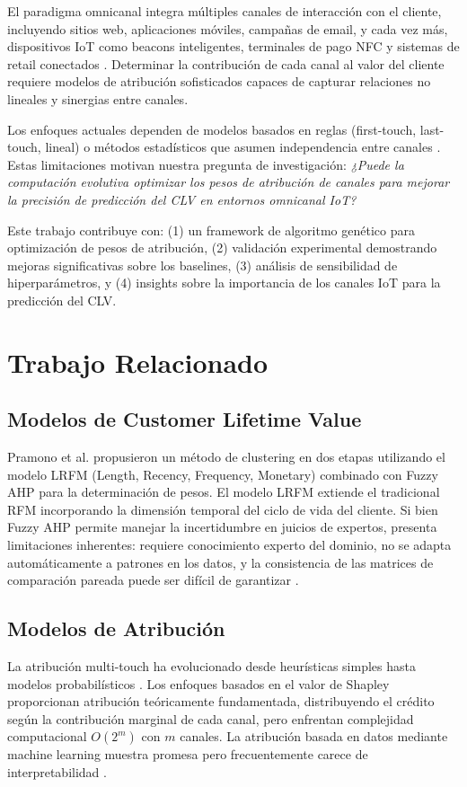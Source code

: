 \documentclass[conference]{IEEEtran}
\begin{document}
El paradigma omnicanal integra múltiples canales de interacción con el cliente, incluyendo sitios web, aplicaciones móviles, campañas de email, y cada vez más, dispositivos IoT como beacons inteligentes, terminales de pago NFC y sistemas de retail conectados \cite{verhoef2015}. Determinar la contribución de cada canal al valor del cliente requiere modelos de atribución sofisticados capaces de capturar relaciones no lineales y sinergias entre canales.

Los enfoques actuales dependen de modelos basados en reglas (first-touch, last-touch, lineal) o métodos estadísticos que asumen independencia entre canales \cite{anderl2016}. Estas limitaciones motivan nuestra pregunta de investigación: \textit{¿Puede la computación evolutiva optimizar los pesos de atribución de canales para mejorar la precisión de predicción del CLV en entornos omnicanal IoT?}

Este trabajo contribuye con: (1) un framework de algoritmo genético para optimización de pesos de atribución, (2) validación experimental demostrando mejoras significativas sobre los baselines, (3) análisis de sensibilidad de hiperparámetros, y (4) insights sobre la importancia de los canales IoT para la predicción del CLV.

\section{Trabajo Relacionado}

\subsection{Modelos de Customer Lifetime Value}
Pramono et al. \cite{pramono2019} propusieron un método de clustering en dos etapas utilizando el modelo LRFM (Length, Recency, Frequency, Monetary) combinado con Fuzzy AHP para la determinación de pesos. El modelo LRFM extiende el tradicional RFM incorporando la dimensión temporal del ciclo de vida del cliente. Si bien Fuzzy AHP permite manejar la incertidumbre en juicios de expertos, presenta limitaciones inherentes: requiere conocimiento experto del dominio, no se adapta automáticamente a patrones en los datos, y la consistencia de las matrices de comparación pareada puede ser difícil de garantizar \cite{saaty2008}.

\subsection{Modelos de Atribución}
La atribución multi-touch ha evolucionado desde heurísticas simples hasta modelos probabilísticos \cite{li2014}. Los enfoques basados en el valor de Shapley proporcionan atribución teóricamente fundamentada, distribuyendo el crédito según la contribución marginal de cada canal, pero enfrentan complejidad computacional $O(2^m)$ con $m$ canales. La atribución basada en datos mediante machine learning muestra promesa pero frecuentemente carece de interpretabilidad \cite{dalessandro2012}.
\end{document}
